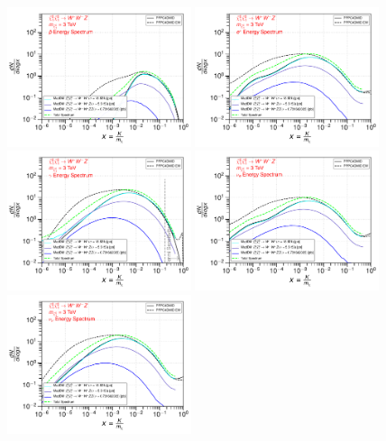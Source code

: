 \documentclass[epj,nopacs,fleqn]{svjour}
\begin{document}
\begin{figure}[!h]
	\centering
	\subfigure
	{ \includegraphics[width=0.48\textwidth]{Fig/Validation_1009/3_antiprotons_n1ww_single_3.pdf} } 
	\subfigure
	{\includegraphics[width=0.48\textwidth]{Fig/Validation_1009/3_positrons_n1ww_single_3.pdf} }
	\subfigure
	{\includegraphics[width=0.48\textwidth]{Fig/Validation_1009/3_gammas_n1ww_single_3.pdf} }
	\subfigure
	{\includegraphics[width=0.48\textwidth]{Fig/Validation_1009/3_neutrinos_e_n1ww_single_3.pdf} }
	\subfigure
	{\includegraphics[width=0.48\textwidth]{Fig/Validation_1009/3_neutrinos_mu_n1ww_single_3.pdf} }

\end{figure}
\end{document}

